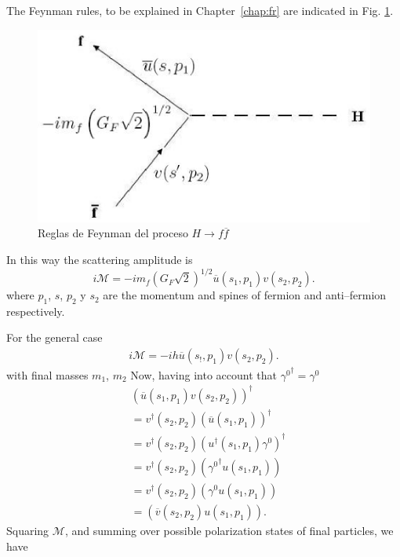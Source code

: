 The Feynman rules, to be explained in Chapter~\ref{chap:fr} are indicated in Fig. 
\ref{fig:b}. %

\begin{figure}[h] %
\begin{center} %
\includegraphics[scale=0.65]{feyn}%
\caption{Reglas de Feynman del proceso $H\to f\overline{f}$}%
\label{fig:b} %
\end{center} %
\end{figure} %

In this way the scattering amplitude is 
\begin{equation}
i\mathcal{M}=-im_{f}\left(G_{F}\sqrt{2}\right)^{1/2}\overline{u}(s_1,
p_{1})v(s_2, p_{2}). 
\end{equation}
where $p_{1}$, $s$,  $p_{2}$ y $s_2$ are the momentum and spines of fermion and anti--fermion respectively.

For the general case
\begin{align}
i\mathcal{M}=-i h\overline{u}(s_!,
p_{1})v(s_2, p_{2}). 
\end{align}
with final masses $m_1$, $m_2$
Now, having into account that ${\gamma^{0}}^{\dag}=\gamma^{0}$
\begin{align*}
&(\overline{u}(s_1,p_{1})v(s_2, p_{2}))^{\dag}\\
&=v^{\dag}(s_2, p_{2})(\overline{u}(s_1,p_{1}))^{\dag}\\
&=v^{\dag}(s_2, p_{2})({u^{\dag}}(s_1,p_{1}){\gamma^{0}})^{\dag}\\
&=v^{\dag}(s_2, p_{2})({\gamma^{0}}^{\dag}u(s_1,p_{1}))\\
&=v^{\dag}(s_2, p_{2})(\gamma^{0}u(s_1,p_{1}))\\
&=(\overline{v}(s_2,p_{2})u(s_1,p_{1})). 
\end{align*}
Squaring  $\mathcal{M}$,  and summing over possible polarization states of final particles, we have

